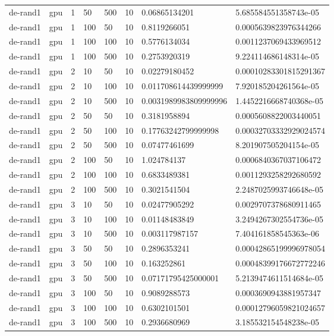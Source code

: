 \begin{table}[t]
\begin{tabular}{llllllll}
de-rand1 & gpu & 1 & 50 & 500 & 10 & 0.06865134201 & 5.685584551358743e-05 \\
de-rand1 & gpu & 1 & 100 & 50 & 10 & 0.8119266051 & 0.0005639823976344266 \\
de-rand1 & gpu & 1 & 100 & 100 & 10 & 0.5776134034 & 0.0011237069433969512 \\
de-rand1 & gpu & 1 & 100 & 500 & 10 & 0.2753920319 & 9.224114686148314e-05 \\
de-rand1 & gpu & 2 & 10 & 50 & 10 & 0.02279180452 & 0.00010283301815291367 \\
de-rand1 & gpu & 2 & 10 & 100 & 10 & 0.011708614439999999 & 7.920185204261564e-05 \\
de-rand1 & gpu & 2 & 10 & 500 & 10 & 0.0031989983809999996 & 1.4452216668740368e-05 \\
de-rand1 & gpu & 2 & 50 & 50 & 10 & 0.3181958894 & 0.0005608822003440051 \\
de-rand1 & gpu & 2 & 50 & 100 & 10 & 0.17763242799999998 & 0.00032703332929024574 \\
de-rand1 & gpu & 2 & 50 & 500 & 10 & 0.07477461699 & 8.201907505204154e-05 \\
de-rand1 & gpu & 2 & 100 & 50 & 10 & 1.024784137 & 0.0006840367037106472 \\
de-rand1 & gpu & 2 & 100 & 100 & 10 & 0.6833489381 & 0.0011293258292680592 \\
de-rand1 & gpu & 2 & 100 & 500 & 10 & 0.3021541504 & 2.2487025993746648e-05 \\
de-rand1 & gpu & 3 & 10 & 50 & 10 & 0.02477905292 & 0.0029707378680911465 \\
de-rand1 & gpu & 3 & 10 & 100 & 10 & 0.01148483849 & 3.2494267302554736e-05 \\
de-rand1 & gpu & 3 & 10 & 500 & 10 & 0.003117987157 & 7.404161858545363e-06 \\
de-rand1 & gpu & 3 & 50 & 50 & 10 & 0.2896353241 & 0.00042865199996978054 \\
de-rand1 & gpu & 3 & 50 & 100 & 10 & 0.163252861 & 0.00048399176672772246 \\
de-rand1 & gpu & 3 & 50 & 500 & 10 & 0.07171795425000001 & 5.2139474611514684e-05 \\
de-rand1 & gpu & 3 & 100 & 50 & 10 & 0.9089288573 & 0.0003690943881957347 \\
de-rand1 & gpu & 3 & 100 & 100 & 10 & 0.6302101501 & 0.00012796059821024657 \\
de-rand1 & gpu & 3 & 100 & 500 & 10 & 0.2936680969 & 3.185532154548238e-05 \\

\end{tabular}
\end{table}

